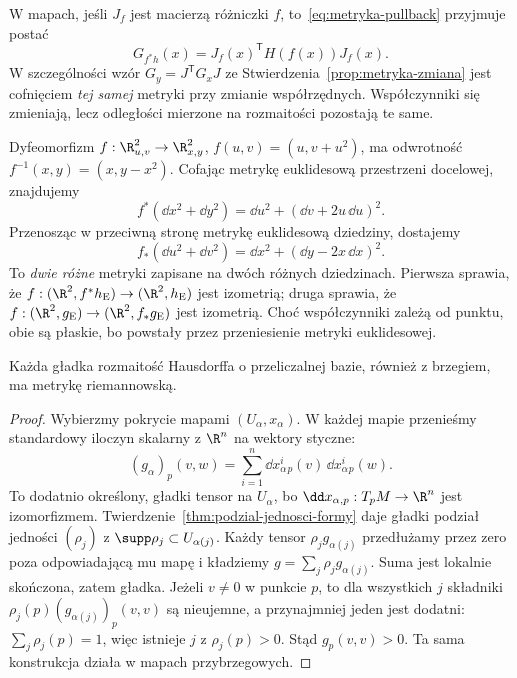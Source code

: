 W mapach, jeśli $J_f$ jest macierzą różniczki $f$,
to~\eqref{eq:metryka-pullback} przyjmuje postać
\[
 G_{f^*h}(x)=J_f(x)^{\mathsf T}H(f(x))J_f(x).
\]
W szczególności wzór
$G_y=J^{\mathsf T}G_xJ$ ze
Stwierdzenia~\ref{prop:metryka-zmiana} jest
cofnięciem \emph{tej samej} metryki przy zmianie
współrzędnych. Współczynniki się zmieniają, lecz
odległości mierzone na rozmaitości pozostają te same.

\begin{przyklad}
\label{prz:metryka-pull-push-przyklad}
Dyfeomorfizm $f:\R^2_{u,v}\to\R^2_{x,y}$,
$f(u,v)=(u,v+u^2)$, ma odwrotność
$f^{-1}(x,y)=(x,y-x^2)$. Cofając metrykę
euklidesową przestrzeni docelowej, znajdujemy
\[
 f^*(\dd x^2+\dd y^2)
 =\dd u^2+(\dd v+2u\,\dd u)^2.
\]
Przenosząc w przeciwną stronę metrykę euklidesową
dziedziny, dostajemy
\[
 f_*(\dd u^2+\dd v^2)
 =\dd x^2+(\dd y-2x\,\dd x)^2.
\]
To \emph{dwie różne} metryki zapisane na dwóch
różnych dziedzinach. Pierwsza sprawia, że
$f:(\R^2,f^*h_{\mathrm E})\to(\R^2,h_{\mathrm E})$
jest izometrią; druga sprawia, że
$f:(\R^2,g_{\mathrm E})\to(\R^2,f_*g_{\mathrm E})$
jest izometrią. Choć współczynniki zależą od punktu,
obie są płaskie, bo powstały przez przeniesienie
metryki euklidesowej.
\end{przyklad}

\begin{twierdzenie}
\label{thm:istnienie-metryki}
Każda gładka rozmaitość Hausdorffa o przeliczalnej bazie,
również z brzegiem, ma metrykę riemannowską.
\end{twierdzenie}
\begin{proof}
Wybierzmy pokrycie mapami $(U_\alpha,x_\alpha)$.
W każdej mapie przenieśmy standardowy iloczyn skalarny
z $\R^n$ na wektory styczne:
\[
 (g_\alpha)_p(v,w)
 =\sum_{i=1}^n
   \dd x_\alpha^i{}_p(v)\,\dd x_\alpha^i{}_p(w).
\]
To dodatnio określony, gładki tensor na $U_\alpha$,
bo $\dd x_{\alpha,p}:T_pM\to\R^n$ jest izomorfizmem.
Twierdzenie~\ref{thm:podzial-jednosci-formy}
daje gładki podział jedności $(\rho_j)$
z $\supp\rho_j\subset U_{\alpha(j)}$.
Każdy tensor $\rho_jg_{\alpha(j)}$ przedłużamy przez
zero poza odpowiadającą mu mapę i kładziemy
$g=\sum_j\rho_jg_{\alpha(j)}$.
Suma jest lokalnie skończona, zatem gładka.
Jeżeli $v\ne0$ w punkcie $p$, to dla wszystkich $j$
składniki $\rho_j(p)(g_{\alpha(j)})_p(v,v)$ są
nieujemne, a przynajmniej jeden jest dodatni:
$\sum_j\rho_j(p)=1$, więc istnieje $j$ z
$\rho_j(p)>0$. Stąd $g_p(v,v)>0$.
Ta sama konstrukcja działa w mapach przybrzegowych.
\end{proof}

